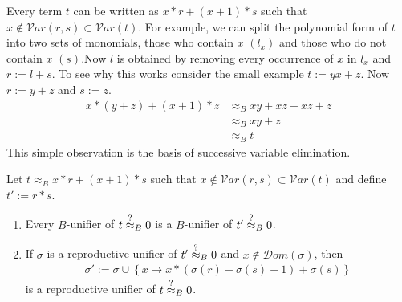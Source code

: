 		Every term $t$ can be written as $x*r+(x+1)*s$ such that $x\notin\mathcal{V}ar(r,s)\subset\mathcal{V}ar(t)$. For example, we can split the polynomial form of $t$ into two sets of monomials, those who contain $x$  $\left(l_x\right)$ and those who do not contain $x$ $(s)$.Now $l$ is obtained by removing every occurrence of $x$ in $l_x$ and $r:=l+s$. To see why this works consider the small example $t:=yx+z$. Now $r:=y+z$ and $s:=z$.
		\begin{align*}
		x*(y+z)+(x+1)*z&\approx_B xy+xz+xz+z\\
		&\approx_B xy+z\\
		&\approx_B t
		\end{align*}
		This simple observation is the basis of successive variable elimination.
		\begin{theorem}
		Let $t\approx_B x*r+(x+1)*s$ such that $x\notin\mathcal{V}ar(r,s)\subset\mathcal{V}ar(t)$ and define $t':=r*s$.
		\begin{enumerate}
		\item Every $B$-unifier of $t\stackrel{?}{\approx}_B0$ is a $B$-unifier of $t'\stackrel{?}{\approx}_B0$.
		\item If $\sigma$ is a reproductive unifier of $t'\stackrel{?}{\approx}_B0$ and $x\notin\mathcal{D}om(\sigma)$, then 
		\begin{align*}
		\sigma':=\sigma\cup\left\lbrace x\mapsto x*(\sigma(r)+\sigma(s)+1)+\sigma(s)\right\rbrace
		\end{align*}
		is a reproductive unifier of $t\stackrel{?}{\approx}_B0$.
		\end{enumerate}
		\end{theorem}
